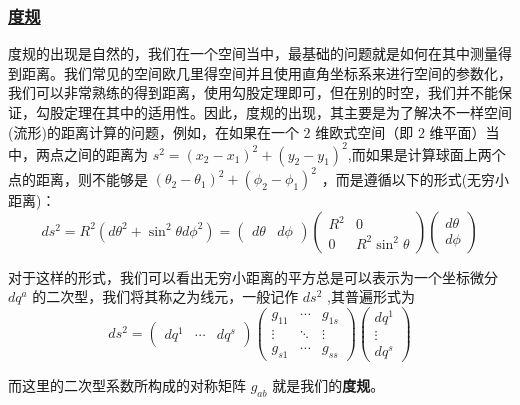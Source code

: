 \subsubsection{\protect\hyperlink{:}{度规}}
度规的出现是自然的，我们在一个空间当中，最基础的问题就是如何在其中测量得到距离。我们常见的空间欧几里得空间并且使用直角坐标系来进行空间的参数化，我们可以非常熟练的得到距离，使用勾股定理即可，但在别的时空，我们并不能保证，勾股定理在其中的适用性。因此，度规的出现，其主要是为了解决不一样空间(流形)的距离计算的问题，例如，在如果在一个 $2$ 维欧式空间（即 $2$ 维平面）当中，两点之间的距离为 $\displaystyle s^2 = (x_2 - x_1)^2 + (y_2 - y_1)^2$,而如果是计算球面上两个点的距离，则不能够是 $\displaystyle (\theta_2 - \theta_1)^2 + (\phi_2 - \phi_1)^2$ ，而是遵循以下的形式(无穷小距离)：
\begin{equation}
    ds^2 = R^2\left(d\theta^2 + \sin^2\theta d\phi^2\right) = 
    \begin{pmatrix}
        d\theta & d\phi
    \end{pmatrix}
    \begin{pmatrix}
        R^2 & 0\\
        0 & R^2\sin^2\theta
    \end{pmatrix}
    \begin{pmatrix}
        d\theta\\
        d\phi
    \end{pmatrix}
\end{equation}

对于这样的形式，我们可以看出无穷小距离的平方总是可以表示为一个坐标微分 ${dq^a}$ 的二次型，我们将其称之为线元，一般记作 $ds^2$ ,其普遍形式为
\begin{equation}
    ds^2 = 
    \begin{pmatrix}
        dq^1 & \cdots & dq^s
    \end{pmatrix}
    \begin{pmatrix}
        g_{11} & \cdots & g_{1s}\\
        \vdots & \ddots & \vdots\\
        g_{s1} & \cdots & g_{ss}
    \end{pmatrix}
    \begin{pmatrix}
        dq^1\\
        \vdots\\
        dq^s
    \end{pmatrix}
\end{equation}

而这里的二次型系数所构成的对称矩阵 $g_{ab}$ 就是我们的\textbf{度规}。

